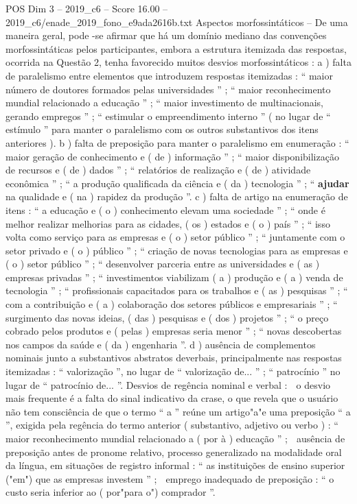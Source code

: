 \begin{textsample}{POS Dim 3 – 2019\_c6 – Score 16.00 – 2019\_c6/enade\_2019\_fono\_e9ada2616b.txt}
Aspectos morfossintáticos – De uma maneira geral, pode -se afirmar que há um domínio mediano das convenções morfossintáticas pelos participantes, embora a estrutura itemizada das respostas, ocorrida na Questão 2, tenha favorecido muitos desvios morfossintáticos : a ) falta de paralelismo entre elementos que introduzem respostas itemizadas : “ maior número de doutores formados pelas universidades ” ; “ maior reconhecimento mundial relacionado a educação ” ; “ maior investimento de multinacionais, gerando empregos ” ; “ estimular o empreendimento interno ” ( no lugar de “ estímulo ” para manter o paralelismo com os outros substantivos dos itens anteriores ). b ) falta de preposição para manter o paralelismo em enumeração : “ maior geração de conhecimento e ( de ) informação ” ; “ maior disponibilização de recursos e ( de ) dados ” ; “ relatórios de realização e ( de ) atividade econômica ” ; “ a produção qualificada da ciência e ( da ) tecnologia ” ; “ \textbf{ajudar} na qualidade e ( na ) rapidez da produção ”. c ) falta de artigo na enumeração de itens : “ a educação e ( o ) conhecimento elevam uma sociedade ” ; “ onde é melhor realizar melhorias para as cidades, ( os ) estados e ( o ) país ” ; “ isso volta como serviço para as empresas e ( o ) setor público ” ; “ juntamente com o setor privado e ( o ) público ” ; “ criação de novas tecnologias para as empresas e ( o ) setor público ” ; “ desenvolver parceria entre as universidades e ( as ) empresas privadas ” ; “ investimentos viabilizam ( a ) produção e ( a ) venda de tecnologia ” ; “ profissionais capacitados para os trabalhos e ( as ) pesquisas ” ; “ com a contribuição e ( a ) colaboração dos setores públicos e empresariais ” ; “ surgimento das novas ideias, ( das ) pesquisas e ( dos ) projetos ” ; “ o preço cobrado pelos produtos e ( pelas ) empresas seria menor ” ; “ novas descobertas nos campos da saúde e ( da ) engenharia ”. d ) ausência de complementos nominais junto a substantivos abstratos deverbais, principalmente nas respostas itemizadas : “ valorização ”, no lugar de “ valorização de... ” ; “ patrocínio ” no lugar de “ patrocínio de... ”.
Desvios de regência nominal e verbal :  o desvio mais frequente é a falta do sinal indicativo da crase, o que revela que o usuário não tem consciência de que o termo “ a ” reúne um artigo"a"e uma preposição “ a ”, exigida pela regência do termo anterior ( substantivo, adjetivo ou verbo ) : “ maior reconhecimento mundial relacionado a ( por à ) educação ” ;  ausência de preposição antes de pronome relativo, processo generalizado na modalidade oral da língua, em situações de registro informal : “ as instituições de ensino superior ("em") que as empresas investem ” ;  emprego inadequado de preposição : “ o custo seria inferior ao ( por"para o") comprador ”.

\end{textsample}
